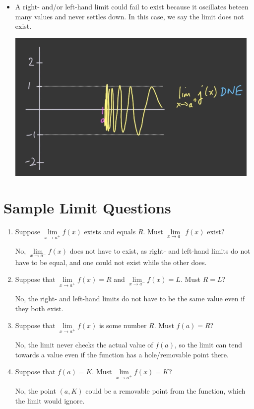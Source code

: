 \documentclass{article}
\begin{document}
\begin{itemize}
    \item A right- and/or left-hand limit could fail to exist because it oscillates beteen many values
    and never settles down. In this case, we say the limit does not exist.
    \begin{center}\includegraphics[scale = 0.35]{Images/PossibleBehavior4.png}\end{center}
\end{itemize}

\section{Sample Limit Questions}
\begin{enumerate}
\item Suppose $\underset{x \rightarrow a^{+}}{\lim} f(x)$ exists and equals $R$. Must
    $\underset{x \rightarrow a^{-}}{\lim} f(x)$ exist?

No, $\underset{x \rightarrow a^{-}}{\lim} f(x)$ does not have to exist, as right- and left-hand limits
do not have to be equal, and one could not exist while the other does.

\item Suppose that $\underset{x \rightarrow a^{+}}{\lim} f(x) = R$ and
    $\underset{x \rightarrow a^{-}}{\lim} f(x) = L$. Must $R = L$?

No, the right- and left-hand limits do not have to be the same value even if they both exist.

\item Suppose that $\underset{x \rightarrow a^{+}}{\lim} f(x)$ is some number $R$. Must $f(a) = R$?

No, the limit never checks the actual value of $f(a)$, so the limit can tend towards a value
even if the function has a hole/removable point there.

\item Suppose that $f(a) = K$. Must $\underset{x \rightarrow a^{+}}{\lim} f(x) = K$?

No, the point $(a, K)$ could be a removable point from the function, which the limit would ignore.
\end{enumerate}
\end{document}
